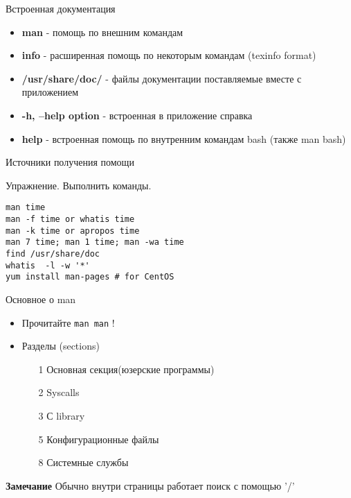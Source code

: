 \begin{frame}[fragile]{Встроенная документация}
\begin{itemize}
    \item \textbf{man} - помощь по внешним командам
    \pause
    \item \textbf{info} - расширенная помощь по некоторым командам (texinfo format)
    \pause
    \item \textbf{/usr/share/doc/} - файлы документации поставляемые вместе с приложением
    \item \textbf{-h, --help option} - встроенная в приложение справка
    \item \textbf{help} - встроенная помощь по внутренним командам bash (также man bash)
\end{itemize}
\end{frame}
\begin{frame}[fragile]{Источники получения помощи}
     \begin{block}{Упражнение. Выполнить команды.}
        \begin{lstlisting}
man time
man -f time or whatis time
man -k time or apropos time
man 7 time; man 1 time; man -wa time
find /usr/share/doc
whatis  -l -w '*'
yum install man-pages # for CentOS
        \end{lstlisting}
    \end{block}
\end{frame}
\begin{frame}[fragile]{Основное о man}
		\begin{itemize}
			\item Прочитайте {\tt man man} !
			\item Разделы (sections)
				\begin{itemize}
					\item[1] Основная секция(юзерские программы)
					\item[2] Syscalls
					\item[3] С library
					\item[5] Конфигурационные файлы
					\item[8] Системные службы
				\end{itemize}
		\end{itemize}
	  \textbf{Замечание}
	  Обычно внутри страницы работает поиск с помощью '/'
	
\end{frame}



